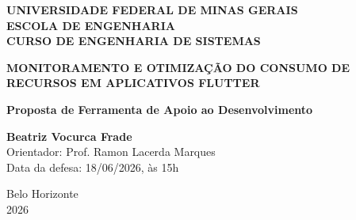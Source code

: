 \begin{titlepage}
\begin{center}

{\large \textbf{UNIVERSIDADE FEDERAL DE MINAS GERAIS}\\
\textbf{ESCOLA DE ENGENHARIA}\\
\textbf{CURSO DE ENGENHARIA DE SISTEMAS}}

\vfill
  {\huge \textbf{MONITORAMENTO E OTIMIZAÇÃO DO CONSUMO DE RECURSOS EM APLICATIVOS FLUTTER}\par}
  \vspace{1cm}

{\Large \textbf{Proposta de Ferramenta de Apoio ao Desenvolvimento}}

\vfill
{\large \textbf{Beatriz Vocurca Frade}}\\[1.2cm]

{\large Orientador: Prof. Ramon Lacerda Marques}\\[1cm]

{\large Data da defesa: 18/06/2026, às 15h}

\vfill
{\large Belo Horizonte}\\
{\large 2026}

\end{center}
\end{titlepage}

